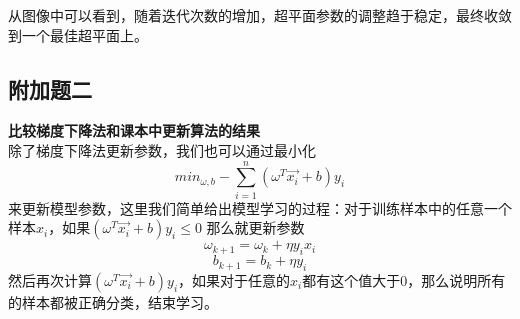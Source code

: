 \documentclass{article}
\begin{document}
 从图像中可以看到，随着迭代次数的增加，超平面参数的调整趋于稳定，最终收敛到一个最佳超平面上。
 \subsection*{\Large 附加题二}
 {\large\textbf{比较梯度下降法和课本中更新算法的结果}}\\


 除了梯度下降法更新参数，我们也可以通过最小化
 $$min_{\omega,b}-\sum_{i = 1}^{n}  (\omega^T\overrightarrow{x_i}+b )y_i$$
 来更新模型参数，这里我们简单给出模型学习的过程：对于训练样本中的任意一个样本$x_i$，如果$(\omega^T\overrightarrow{x_i}+b )y_i\leq 0$
 那么就更新参数$$\omega_{k+1}=\omega_k+\eta y_ix_i$$
 $$b_{k+1}=b_k+\eta y_i$$
 然后再次计算$(\omega^T\overrightarrow{x_i}+b )y_i$，如果对于任意的$x_i$都有这个值大于$0$，那么说明所有的样本都被正确分类，结束学习。
\end{document}
